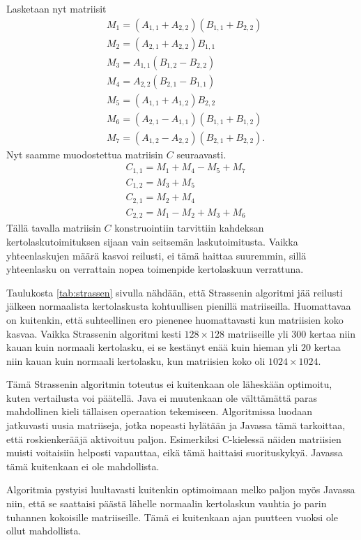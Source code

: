 \documentclass[10pt,a4paper,titlepage]{article}
\begin{document}
Lasketaan nyt matriisit
\begin{align*}
& M_1 = (A_{1,1}+A_{2,2})(B_{1,1} + B_{2,2})\\
& M_2 = (A_{2,1}+A_{2,2})B_{1,1} \\
& M_3 = A_{1,1}(B_{1,2} - B_{2,2})\\
& M_4 = A_{2,2}(B_{2,1} - B_{1,1})\\
& M_5 = (A_{1,1}+A_{1,2})B_{2,2}\\
& M_6 = (A_{2,1}-A_{1,1})(B_{1,1} + B_{1,2})\\
& M_7 = (A_{1,2}-A_{2,2})(B_{2,1} + B_{2,2}).
\end{align*}
Nyt saamme muodostettua matriisin $C$ seuraavasti.
\begin{align*}
&C_{1,1} = M_{1}+M_{4}-M_{5}+M_{7} \\
&C_{1,2} = M_{3}+M_{5} \\
&C_{2,1} = M_{2}+M_{4} \\
&C_{2,2} = M_{1}-M_{2}+M_{3}+M_{6}
\end{align*}
Tällä tavalla matriisin $C$ konstruointiin tarvittiin kahdeksan kertolaskutoimituksen sijaan vain seitsemän laskutoimitusta.
Vaikka yhteenlaskujen määrä kasvoi reilusti, ei tämä haittaa suuremmin, sillä yhteenlasku on verrattain nopea toimenpide 
kertolaskuun verrattuna.

Taulukosta \ref{tab:strassen} sivulla \pageref{tab:strassen} nähdään, että Strassenin algoritmi jää reilusti jälkeen normaalista kertolaskusta kohtuullisen pienillä matriiseilla.
Huomattavaa on kuitenkin, että suhteellinen ero pienenee huomattavasti kun matriisien koko kasvaa. Vaikka Strassenin algoritmi kesti $128\times128$ matriiseille
yli $300$ kertaa niin kauan kuin normaali kertolasku, ei se kestänyt enää kuin hieman yli $20$ kertaa niin kauan kuin normaali kertolasku, kun
matriisien koko oli $1024\times1024$.

Tämä Strassenin algoritmin toteutus ei kuitenkaan ole läheskään optimoitu, kuten vertailusta voi päätellä.
Java ei muutenkaan ole välttämättä paras mahdollinen kieli tällaisen operaation tekemiseen.
Algoritmissa luodaan jatkuvasti uusia matriiseja, jotka nopeasti hylätään ja Javassa tämä tarkoittaa, että roskienkerääjä
aktivoituu paljon. Esimerkiksi C-kielessä näiden matriisien muisti voitaisiin helposti vapauttaa, eikä tämä haittaisi suorituskykyä.
Javassa tämä kuitenkaan ei ole mahdollista.

Algoritmia pystyisi luultavasti kuitenkin optimoimaan melko paljon myös Javassa niin, että se saattaisi päästä lähelle normaalin
kertolaskun vauhtia jo parin tuhannen kokoisille matriiseille. Tämä ei kuitenkaan ajan puutteen vuoksi ole ollut mahdollista.
\end{document}
